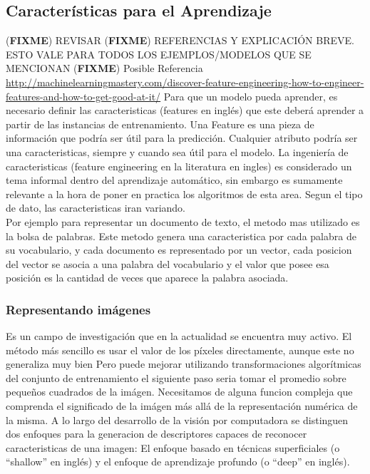 \documentclass[a4paper,11pt,spanish]{book}
\newcommand*{\FIXME}[1]{{(\textbf{FIXME}) {#1}}}
\begin{document}
    \subsection{Características para el Aprendizaje}
      \FIXME{REVISAR}
      \FIXME{REFERENCIAS Y EXPLICACIÓN BREVE. ESTO VALE PARA TODOS LOS EJEMPLOS/MODELOS QUE SE MENCIONAN}
      \FIXME{Posible Referencia \url{http://machinelearningmastery.com/discover-feature-engineering-how-to-engineer-features-and-how-to-get-good-at-it/}}
      Para que un modelo pueda aprender, es necesario definir las caracteristicas (features en inglés) que este deberá aprender a partir de las instancias de entrenamiento.
      Una Feature es una pieza de información que podría ser útil para la predicción. Cualquier atributo podría ser una caracteristicas, siempre y cuando sea útil para el modelo.
      La ingeniería de caracteristicas (feature engineering en la literatura en ingles) es considerado un tema informal dentro del aprendizaje automático, sin embargo es sumamente
      relevante a la hora de poner en practica los algoritmos de esta area.
      Segun el tipo de dato, las caracteristicas iran variando. \\
      Por ejemplo para representar un documento de texto, el metodo mas utilizado es la bolsa de palabras.
      Este metodo genera una caracteristica por cada palabra de su vocabulario, y cada documento es representado por un vector, cada posicion del vector se asocia a una palabra del 
      vocabulario y el valor que posee esa posición es la cantidad de veces que aparece la palabra asociada.

      \subsubsection{Representando imágenes}
	Es un campo de investigación que en la actualidad se encuentra muy activo. El método más sencillo es usar el valor de los píxeles directamente, aunque este no generaliza muy bien
	Pero puede mejorar utilizando transformaciones algorítmicas del conjunto de entrenamiento el siguiente paso seria tomar el promedio sobre pequeños cuadrados de la imágen.
	Necesitamos de alguna funcion compleja que comprenda el significado de la imágen más allá de la representación numérica de la misma.
	A lo largo del desarrollo de la visión por computadora se distinguen dos enfoques para la generacion de descriptores capaces de reconocer caracteristicas de una imagen: 
	El enfoque basado en técnicas superficiales (o “shallow” en inglés) y el enfoque de aprendizaje profundo (o “deep” en inglés).
\end{document}
